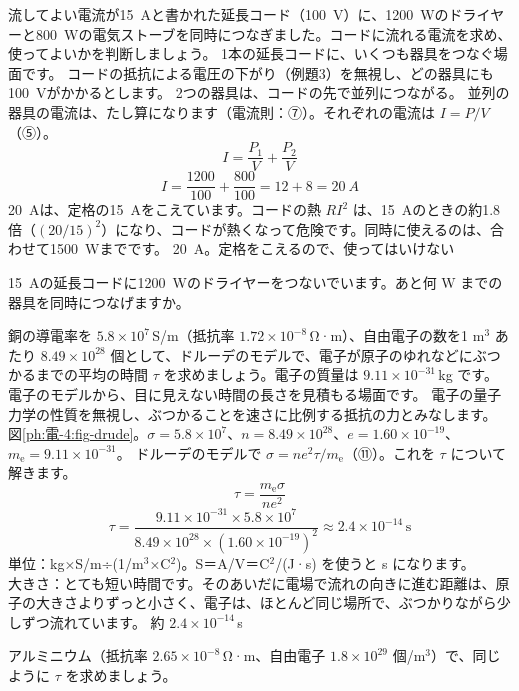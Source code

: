 \label{ph:電-4:ex12}
\begin{phreidai}[延長コードにつなぎすぎる]
流してよい電流が\qty{15}{A}と書かれた延長コード（\qty{100}{V}）に、\qty{1200}{W}のドライヤーと\qty{800}{W}の電気ストーブを同時につなぎました。コードに流れる電流を求め、使ってよいかを判断しましょう。
\phbamen
1本の延長コードに、いくつも器具をつなぐ場面です。
\phmushi
コードの抵抗による電圧の下がり（例題3）を無視し、どの器具にも\qty{100}{V}がかかるとします。
\phzu
2つの器具は、コードの先で並列につながる。
\phriyu
並列の器具の電流は、たし算になります（電流則：⑦）。それぞれの電流は $I=P/V$（⑤）。
\phtateru
\[I=\frac{P_1}{V}+\frac{P_2}{V}\]
\phtoku
\[I=\frac{1200}{100}+\frac{800}{100}=12+8=\qty{20}{A}\]
\phtashikame
\qty{20}{A}は、定格の\qty{15}{A}をこえています。コードの熱 $RI^2$ は、\qty{15}{A}のときの約1.8倍（$(20/15)^2$）になり、コードが熱くなって危険です。同時に使えるのは、合わせて\qty{1500}{W}までです。
\kotae \qty{20}{A}。定格をこえるので、使ってはいけない
\end{phreidai}
\begin{jibun}
\qty{15}{A}の延長コードに\qty{1200}{W}のドライヤーをつないでいます。あと何 W までの器具を同時につなげますか。
\end{jibun}

\label{ph:電-4:ex13}
\begin{phreidai}[銅の中の電子がぶつかるまでの時間]
銅の導電率を $5.8\times10^7$\,S/m（抵抗率 $1.72\times10^{-8}$\,Ω·m）、自由電子の数を1 m$^3$ あたり $8.49\times10^{28}$ 個として、ドルーデのモデルで、電子が原子のゆれなどにぶつかるまでの平均の時間 $\tau$ を求めましょう。電子の質量は $9.11\times10^{-31}$\,kg です。
\phbamen
電子のモデルから、目に見えない時間の長さを見積もる場面です。
\phmushi
電子の量子力学の性質を無視し、ぶつかることを速さに比例する抵抗の力とみなします。
\phzu
図\ref{ph:電-4:fig-drude}。$\sigma=5.8\times10^7$、$n=8.49\times10^{28}$、$e=1.60\times10^{-19}$、$m_{\mathrm e}=9.11\times10^{-31}$。
\phriyu
ドルーデのモデルで $\sigma=ne^2\tau/m_{\mathrm e}$（⑪）。これを $\tau$ について解きます。
\phtateru
\[\tau=\frac{m_{\mathrm e}\sigma}{ne^2}\]
\phtoku
\[\tau=\frac{9.11\times10^{-31}\times5.8\times10^7}{8.49\times10^{28}\times(1.60\times10^{-19})^2}\approx2.4\times10^{-14}\,\text{s}\]
\phtashikame
単位：kg×S/m÷(1/m$^3$×C$^2$)。S＝A/V＝C$^2$/(J·s) を使うと s になります。\\
大きさ：とても短い時間です。そのあいだに電場で流れの向きに進む距離は、原子の大きさよりずっと小さく、電子は、ほとんど同じ場所で、ぶつかりながら少しずつ流れています。
\kotae 約 $2.4\times10^{-14}$\,s
\end{phreidai}
\begin{jibun}
アルミニウム（抵抗率 $2.65\times10^{-8}$\,Ω·m、自由電子 $1.8\times10^{29}$ 個/m$^3$）で、同じように $\tau$ を求めましょう。
\end{jibun}

